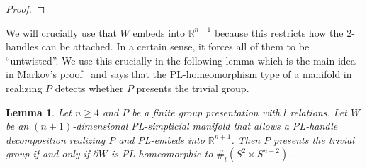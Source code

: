 \documentclass[a4paper, reqno]{amsart}
\newtheorem{lemma}[proposition]{Lemma}
\theoremstyle{definition}
\theoremstyle{remark}
\newcommand{\Q}{\mathbb{Q}}
\newcommand{\R}{\mathbb{R}}
\newcommand{\comm}[2]{%
  {\color{red}#1: #2}}
\renewcommand{\~}{\nobreak\ }
\begin{document}
\begin{proof}
\end{proof}
We will crucially use that $W$ embeds into $\R^{n+1}$ because this restricts how the 2-handles can be attached. In a certain sense, it forces all of them to be \enquote{untwisted}. We use this crucially in the following lemma which is the main idea in Markov's proof\~\cite{Markov} and says that the PL-homeo\-mor\-phism type of a manifold in realizing $P$ detects whether $P$ presents the trivial group. 
\begin{lemma}\label{lem:PtrivialiffS2}
    Let $n\geq4$ and $P$ be a finite group presentation with $l$ relations. Let $W$ be an $(n+1)$-dimensional PL-simplicial manifold that allows a PL-handle decomposition realizing $P$ and PL-embeds into $\R^{n+1}$. Then $P$ presents the trivial group if and only if $\partial W$ is PL-homeomorphic to $\#_l(S^2\times S^{n-2})$.
\end{lemma}
\end{document}
